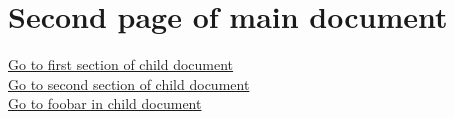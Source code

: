 \section{Second page of main document}
\href{gotoe:%
  dest=section.1,embedded=hypgotoe-child.pdf%
}{Go to first section of child document}\\
\href{gotoe:%
  dest=section.2,embedded=hypgotoe-child.pdf%
}{Go to second section of child document}\\
\href{gotoe:%
  dest=foobar,embedded=hypgotoe-child.pdf%
}{Go to foobar in child document}

\endinput
